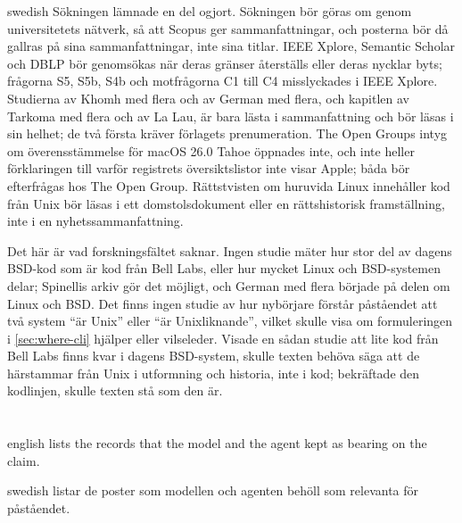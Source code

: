\begin{onlyin}{swedish}
Sökningen lämnade en del ogjort.
Sökningen bör göras om genom universitetets nätverk, så att Scopus ger
sammanfattningar, och posterna bör då gallras på sina sammanfattningar,
inte sina titlar.
IEEE Xplore, Semantic Scholar och DBLP bör genomsökas när deras gränser
återställs eller deras nycklar byts; frågorna S5, S5b, S4b och
motfrågorna C1 till C4 misslyckades i IEEE Xplore.
Studierna av Khomh med flera och av German med flera, och kapitlen av
Tarkoma med flera och av La Lau, är bara lästa i sammanfattning och bör
läsas i sin helhet; de två första kräver förlagets prenumeration.
The Open Groups intyg om överensstämmelse för macOS 26.0 Tahoe öppnades
inte, och inte heller förklaringen till varför registrets
översiktslistor inte visar Apple; båda bör efterfrågas hos The Open
Group.
Rättstvisten om huruvida Linux innehåller kod från Unix bör läsas i ett
domstolsdokument eller en rättshistorisk framställning, inte i en
nyhetssammanfattning.

Det här är vad forskningsfältet saknar.
Ingen studie mäter hur stor del av dagens BSD-kod som är kod från Bell
Labs, eller hur mycket Linux och BSD-systemen delar; Spinellis arkiv gör
det möjligt, och German med flera började på delen om Linux och BSD.
Det finns ingen studie av hur nybörjare förstår påståendet att två
system \enquote{är Unix} eller \enquote{är Unixliknande}, vilket skulle
visa om formuleringen i \cref{sec:where-cli} hjälper eller vilseleder.
Visade en sådan studie att lite kod från Bell Labs finns kvar i dagens
BSD-system, skulle texten behöva säga att de härstammar från Unix i
utformning och historia, inte i kod; bekräftade den kodlinjen, skulle
texten stå som den är.
\end{onlyin}

\section{} %

\begin{onlyin}{english} %
 lists the records that the model and the agent
kept as bearing on the claim.
\end{onlyin}
\begin{onlyin}{swedish}
 listar de poster som modellen och agenten behöll
som relevanta för påståendet.
\end{onlyin}

